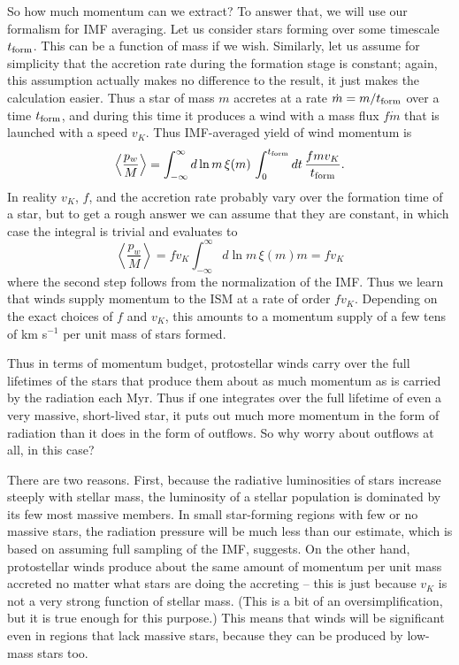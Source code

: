 So how much momentum can we extract? To answer that, we will use our formalism for IMF averaging. Let us consider stars forming over some timescale $t_{\rm form}$. This can be a function of mass if we wish. Similarly, let us assume for simplicity that the accretion rate during the formation stage is constant; again, this assumption actually makes no difference to the result, it just makes the calculation easier. Thus a star of mass $m$ accretes at a rate $\dot{m} = m/t_{\rm form}$ over a time $t_{\rm form}$, and during this time it produces a wind with a mass flux $f \dot{m}$ that is launched with a speed $v_K$. Thus IMF-averaged yield of wind momentum is
\begin{equation}
\left\langle\frac{p_w}{M}\right\rangle = \int_{-\infty}^{\infty} d\ln m \, \xi(m) \, \int_0^{t_{\rm form}} dt \, \frac{f m v_K}{t_{\rm form}}.
\end{equation}
In reality $v_K$, $f$, and the accretion rate probably vary over the formation time of a star, but to get a rough answer we can assume that they are constant, in which case the integral is trivial and evaluates to
\begin{equation}
\left\langle\frac{p_w}{M}\right\rangle =  f v_K \int_{-\infty}^{\infty} d\ln m \, \xi(m) m = f v_K
\end{equation}
where the second step follows from the normalization of the IMF. Thus we learn that winds supply momentum to the ISM at a rate of order $f v_K$. Depending on the exact choices of $f$ and $v_K$, this amounts to a momentum supply of a few tens of km s$^{-1}$ per unit mass of stars formed.

Thus in terms of momentum budget, protostellar winds carry over the full lifetimes of the stars that produce them about as much momentum as is carried by the radiation each Myr. Thus if one integrates over the full lifetime of even a very massive, short-lived star, it puts out much more momentum in the form of radiation than it does in the form of outflows. So why worry about outflows at all, in this case?

There are two reasons. First, because the radiative luminosities of stars increase steeply with stellar mass, the luminosity of a stellar population is dominated by its few most massive members. In small star-forming regions with few or no massive stars, the radiation pressure will be much less than our estimate, which is based on assuming full sampling of the IMF, suggests. On the other hand, protostellar winds produce about the same amount of momentum per unit mass accreted no matter what stars are doing the accreting -- this is just because $v_K$ is not a very strong function of stellar mass. (This is a bit of an oversimplification, but it is true enough for this purpose.) This means that winds will be significant even in regions that lack massive stars, because they can be produced by low-mass stars too.

